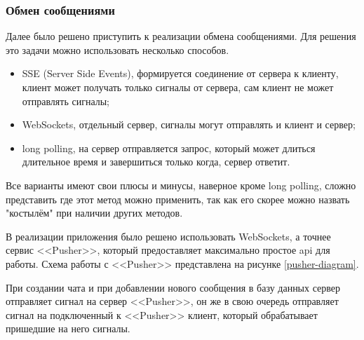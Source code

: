 \subsubsection{Обмен сообщениями}

Далее было решено приступить к реализации обмена сообщениями. Для решения это задачи можно использовать несколько способов.

\begin{itemize}
    \item SSE (Server Side Events), формируется соединение от сервера к клиенту, клиент может получать только сигналы от сервера, сам клиент не может отправлять сигналы;
    \item WebSockets, отдельный сервер, сигналы могут отправлять и клиент и сервер;
    \item long polling, на сервер отправляется запрос, который может длиться длительное время и завершиться только когда, сервер ответит.
\end{itemize}

Все варианты имеют свои плюсы и минусы, наверное кроме long polling, сложно представить где этот метод можно применить, так как его скорее можно назвать "костылём" при наличии других методов.

В реализации приложения было решено использовать WebSockets, а точнее сервис <<Pusher>>, который предоставляет максимально простое api для работы. Схема работы с <<Pusher>> представлена на рисунке \ref{pusher-diagram}.


При создании чата и при добавлении нового сообщения в базу данных сервер отправляет сигнал на сервер <<Pusher>>, он же в свою очередь отправляет сигнал на подключенный к <<Pusher>> клиент, который обрабатывает пришедшие на него сигналы.
